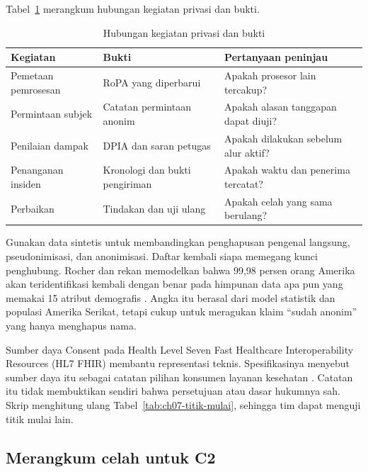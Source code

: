 Tabel~\ref{tab:ch07-manajemen} merangkum hubungan kegiatan privasi dan bukti.

\begin{table}[!htb]
  \centering\small
  \caption{Hubungan kegiatan privasi dan bukti}\label{tab:ch07-manajemen}
  \begin{tabularx}{\textwidth}{|>{\raggedright\arraybackslash}X|>{\raggedright\arraybackslash}X|>{\raggedright\arraybackslash}X|}
    \hline
    \textbf{Kegiatan} & \textbf{Bukti} & \textbf{Pertanyaan peninjau} \\ \hline
    Pemetaan pemrosesan & RoPA yang diperbarui & Apakah prosesor lain tercakup? \\ \hline
    Permintaan subjek & Catatan permintaan anonim & Apakah alasan tanggapan dapat diuji? \\ \hline
    Penilaian dampak & DPIA dan saran petugas & Apakah dilakukan sebelum alur aktif? \\ \hline
    Penanganan insiden & Kronologi dan bukti pengiriman & Apakah waktu dan penerima tercatat? \\
    \hline
    Perbaikan & Tindakan dan uji ulang & Apakah celah yang sama berulang? \\ \hline
  \end{tabularx}
\end{table}

\begin{pendalaman}
Gunakan data sintetis untuk membandingkan penghapusan pengenal langsung, pseudonimisasi, dan
anonimisasi. Daftar kembali siapa memegang kunci penghubung. Rocher dan rekan memodelkan bahwa 99,98
persen orang Amerika akan teridentifikasi kembali dengan benar pada himpunan data apa pun yang
memakai 15 atribut demografis \cite{c07-rocher2019}. Angka itu berasal dari model statistik dan
populasi Amerika Serikat, tetapi cukup untuk meragukan klaim ``sudah anonim'' yang hanya menghapus
nama.

Sumber daya Consent pada Health Level Seven Fast Healthcare Interoperability Resources (HL7 FHIR)
membantu representasi teknis. Spesifikasinya menyebut sumber daya itu sebagai catatan pilihan
konsumen layanan kesehatan \cite{c07-fhir-consent}. Catatan itu tidak membuktikan sendiri bahwa
persetujuan atau dasar hukumnya sah. Skrip 
menghitung ulang Tabel~\ref{tab:ch07-titik-mulai}, sehingga tim dapat menguji titik mulai lain.
\end{pendalaman}

\subsection*{Merangkum celah untuk C2}

